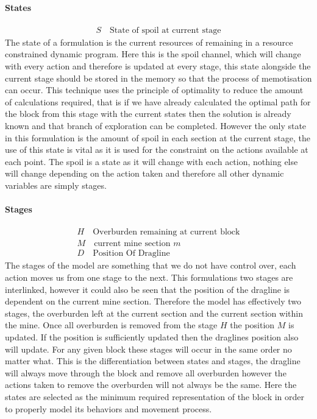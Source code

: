 \paragraph*{States}
\begin{align}
\label{Stte}
S \quad \text{State of spoil at current stage}
\end{align}
The state of a formulation is the current resources of remaining in a resource constrained dynamic program. Here this is the spoil channel, which will change with every action and therefore is updated at every stage, this state alongside the current stage should be stored in the memory so that the process of memotisation can occur. This technique uses the principle of optimality to reduce the amount of calculations required, that is if we have already calculated the optimal path for the block from this stage with the current states then the solution is already known and that branch of exploration can be completed. However the only state in this formulation is the amount of spoil in each section at the current stage, the use of this state is vital as it is used for the constraint on the actions available at each point. The spoil is a state as it will change with each action, nothing else will change depending on the action taken and therefore all other dynamic variables are simply stages. 
\paragraph*{Stages}
\begin{align}
\label{DP:Stage0}
H \quad \text{Overburden remaining at current block}\\
\label{DP:Stage1}
M \quad \text{current mine section }m \\ 
\label{DP:stage2}
D \quad \text{Position Of Dragline}
\end{align}
The stages of the model are something that we do not have control over, each action moves us from one stage to the next. This formulations two stages are interlinked, however it could also be seen that the position of the dragline is dependent on the current mine section. Therefore the model has effectively two stages, the overburden left at the current section and the current section within the mine. Once all overburden is removed from the stage $H$ the position $M$ is updated. If the position is sufficiently updated then the draglines position also will update. For any given block these stages will occur in the same order no matter what. This is the differentiation between states and stages, the dragline will always move through the block and remove all overburden however the actions taken to remove the overburden will not always be the same. Here the states are selected as the minimum required representation of the block in order to properly model its behaviors and movement process. 	
